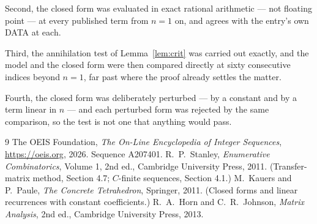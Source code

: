\documentclass[11pt,a4paper]{article}
\theoremstyle{plain}
\theoremstyle{definition}
\begin{document}
Second, the closed form was evaluated in exact rational arithmetic --- not floating point ---
at every published term from $n=1$ on, and agrees with the entry's own DATA at each.

Third, the annihilation test of Lemma~\ref{lem:crit} was carried out exactly, and the model
and the closed form were then compared directly at sixty consecutive indices beyond
$n=1$, far past where the proof already settles the matter.

Fourth, the closed form was deliberately perturbed --- by a constant and by a term linear in
$n$ --- and each perturbed form was rejected by the same comparison, so the test is not one
that anything would pass.

\begin{thebibliography}{9}
 The OEIS Foundation, \emph{The On-Line Encyclopedia of Integer
Sequences}, \url{https://oeis.org}, 2026. Sequence A207401.
 R.~P.~Stanley, \emph{Enumerative Combinatorics}, Volume 1, 2nd ed.,
Cambridge University Press, 2011. (Transfer-matrix method, Section 4.7; $C$-finite sequences,
Section 4.1.)
 M.~Kauers and P.~Paule, \emph{The Concrete Tetrahedron}, Springer, 2011.
(Closed forms and linear recurrences with constant coefficients.)
 R.~A.~Horn and C.~R.~Johnson, \emph{Matrix Analysis}, 2nd ed., Cambridge
University Press, 2013.
\end{thebibliography}
\end{document}
